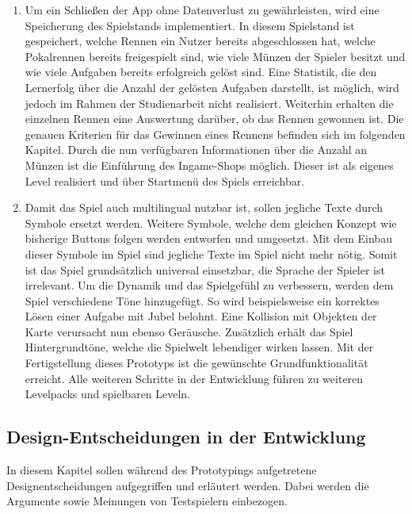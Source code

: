 \begin{enumerate}[itemindent=*,label=\textbf{Prototyp \arabic*}]
		\item{ Um ein Schließen der App ohne Datenverlust zu gewährleisten, wird eine Speicherung des Spielstands implementiert. In diesem Spielstand ist gespeichert, welche Rennen ein Nutzer bereits abgeschlossen hat, welche Pokalrennen bereits freigespielt sind, wie viele Münzen der Spieler besitzt und wie viele Aufgaben bereits erfolgreich gelöst sind. Eine Statistik, die den Lernerfolg über die Anzahl der gelösten Aufgaben darstellt, ist möglich, wird jedoch im Rahmen der Studienarbeit nicht realisiert. Weiterhin erhalten die einzelnen Rennen eine Auswertung darüber, ob das Rennen gewonnen ist. Die genauen Kriterien für das Gewinnen eines Rennens befinden sich im folgenden Kapitel. Durch die nun verfügbaren Informationen über die Anzahl an Münzen ist die Einführung des Ingame-Shops möglich. Dieser ist als eigenes Level realisiert und über Startmenü des Spiels erreichbar.}
		\item{ Damit das Spiel auch multilingual nutzbar ist, sollen jegliche Texte durch Symbole ersetzt werden. Weitere Symbole, welche dem gleichen Konzept wie bisherige Buttons folgen werden entworfen und umgesetzt. Mit dem Einbau dieser Symbole im Spiel sind jegliche Texte im Spiel nicht mehr nötig. Somit ist das Spiel grundsätzlich universal einsetzbar, die Sprache der Spieler ist irrelevant. Um die Dynamik und das Spielgefühl zu verbessern, werden dem Spiel verschiedene Töne hinzugefügt. So wird beispielsweise ein korrektes Lösen einer Aufgabe mit Jubel belohnt. Eine Kollision mit Objekten der Karte verursacht nun ebenso Geräusche. Zusätzlich erhält das Spiel Hintergrundtöne, welche die Spielwelt lebendiger wirken lassen. Mit der Fertigstellung dieses Prototyps ist die gewünschte Grundfunktionalität erreicht. Alle weiteren Schritte in der Entwicklung führen zu weiteren Levelpacks und spielbaren Leveln.}
	\end{enumerate}
\subsection{Design-Entscheidungen in der Entwicklung}
In diesem Kapitel sollen während des Prototypings aufgetretene Designentscheidungen aufgegriffen und erläutert werden. Dabei werden die Argumente sowie Meinungen von Testspielern einbezogen.
